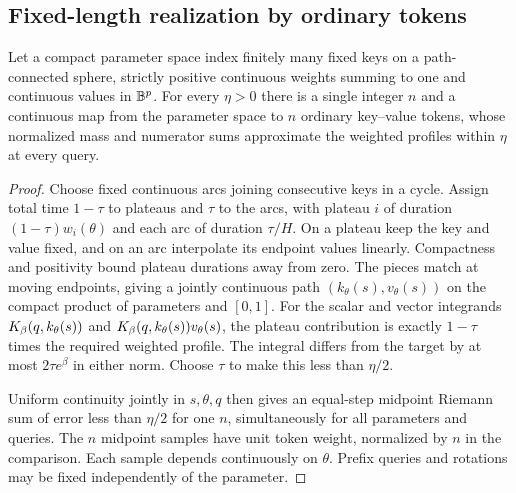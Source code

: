 \subsection{Fixed-length realization by ordinary tokens}\label{sec:realization}
\begin{lemma}\label{lem:realize}
Let a compact parameter space index finitely many fixed keys on a path-connected sphere, strictly positive continuous weights summing to one and continuous values in $\mathbb B^p$. For every $\eta>0$ there is a single integer $n$ and a continuous map from the parameter space to $n$ ordinary key--value tokens, whose normalized mass and numerator sums approximate the weighted profiles within $\eta$ at every query.
\end{lemma}
\begin{proof}
Choose fixed continuous arcs joining consecutive keys in a cycle. Assign total time $1-\tau$ to plateaus and $\tau$ to the arcs, with plateau $i$ of duration $(1-\tau)w_i(\theta)$ and each arc of duration $\tau/H$. On a plateau keep the key and value fixed, and on an arc interpolate its endpoint values linearly. Compactness and positivity bound plateau durations away from zero. The pieces match at moving endpoints, giving a jointly continuous path $(k_\theta(s),v_\theta(s))$ on the compact product of parameters and $[0,1]$. For the scalar and vector integrands $K_\beta(q,k_\theta(s))$ and $K_\beta(q,k_\theta(s))v_\theta(s)$, the plateau contribution is exactly $1-\tau$ times the required weighted profile. The integral differs from the target by at most $2\tau e^\beta$ in either norm. Choose $\tau$ to make this less than $\eta/2$.

Uniform continuity jointly in $s,\theta,q$ then gives an equal-step midpoint Riemann sum of error less than $\eta/2$ for one $n$, simultaneously for all parameters and queries. The $n$ midpoint samples have unit token weight, normalized by $n$ in the comparison. Each sample depends continuously on $\theta$. Prefix queries and rotations may be fixed independently of the parameter.
\end{proof}

